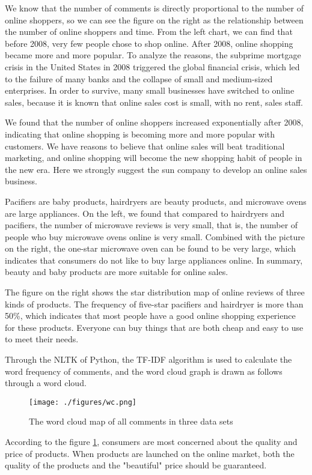 \documentclass{mcmthesis}
\begin{document}
We know that the number of comments is directly proportional to the number of online shoppers, so we can see the figure on the right as the relationship between the number of online shoppers and time. From the left chart, we can find that before 2008, very few people chose to shop online. After 2008, online shopping became more and more popular. To analyze the reasons, the subprime mortgage crisis in the United States in 2008 triggered the global financial crisis, which led to the failure of many banks and the collapse of small and medium-sized enterprises. In order to survive, many small businesses have switched to online sales, because it is known that online sales cost is small, with no rent, sales staff.

We found that the number of online shoppers increased exponentially after 2008, indicating that online shopping is becoming more and more popular with customers. We have reasons to believe that online sales will beat traditional marketing, and online shopping will become the new shopping habit of people in the new era. Here we strongly suggest the sun company to develop an online sales business.

Pacifiers are baby products, hairdryers are beauty products, and microwave ovens are large appliances. On the left, we found that compared to hairdryers and pacifiers, the number of microwave reviews is very small, that is, the number of people who buy microwave ovens online is very small. Combined with the picture on the right, the one-star microwave oven can be found to be very large, which indicates that consumers do not like to buy large appliances online. In summary, beauty and baby products are more suitable for online sales.

The figure on the right shows the star distribution map of online reviews of three kinds of products. The frequency of five-star pacifiers and hairdryer is more than 50\%, which indicates that most people have a good online shopping experience for these products. Everyone can buy things that are both cheap and easy to use to meet their needs.

Through the NLTK of Python, the TF-IDF algorithm is used to calculate the word frequency of comments, and the word cloud graph is drawn as follows through a word cloud.

\begin{figure}[h]
	\centering
	\texttt{[image: ./figures/wc.png]}
	\caption{The word cloud map of all comments in three data sets} \label{wordCloud}
\end{figure}
\newpage
According to the figure \ref{wordCloud}, consumers are most concerned about the quality and price of products. When products are launched on the online market, both the quality of the products and the "beautiful" price should be guaranteed.
\end{document}
